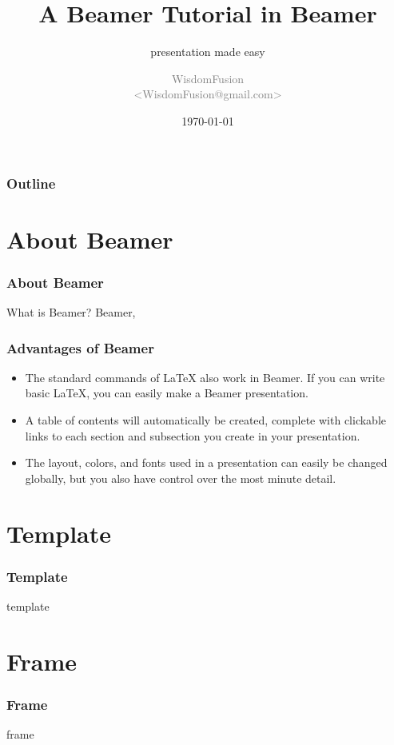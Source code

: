 \documentclass[aspectratio=169]{beamer}
\title[Beamer Tutorial]{A Beamer Tutorial in Beamer}
\subtitle{presentation made easy}
\author[WisdomFusion]{
  \small \textcolor{gray}{WisdomFusion\\ <WisdomFusion@gmail.com>}
}
\date{\today}
\begin{document}
\begin{frame}
  \titlepage
\end{frame}

\begin{frame}
  \frametitle{Outline}

  \tableofcontents
\end{frame}

\section*{About Beamer}
\begin{frame}[t]
  \frametitle{About Beamer}

  \begin{block}{What is Beamer?}
    Beamer,
  \end{block}
  
\end{frame}


\begin{frame}
  \frametitle{Advantages of Beamer}

  \begin{itemize}
    \item The standard commands of \LaTeX{} also work in Beamer. If you can write basic \LaTeX{}, you can easily make a Beamer presentation.
    \item A table of contents will automatically be created, complete with clickable links to each section and subsection you create in your presentation.
    \item The layout, colors, and fonts used in a presentation can easily be changed globally, but you also have control over the most minute detail.
  \end{itemize}
  
\end{frame}

\section*{Template}
\begin{frame}
  \frametitle{Template}

  template
\end{frame}

\section*{Frame}
\begin{frame}
  \frametitle{Frame}

  frame
\end{frame}
\end{document}
